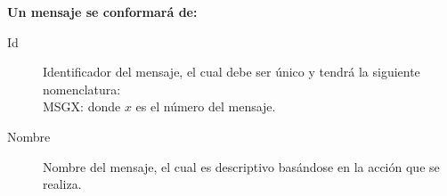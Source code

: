 \textbf{Un mensaje se conformará de:}

\begin{description}
    \item[Id] Identificador del mensaje, el cual debe ser único y tendrá la siguiente nomenclatura: \\
    MSGX: donde $x$ es el número del mensaje.
    
    \item[Nombre] Nombre del mensaje, el cual es descriptivo basándose en la acción que se realiza.
    
    
\end{description}


